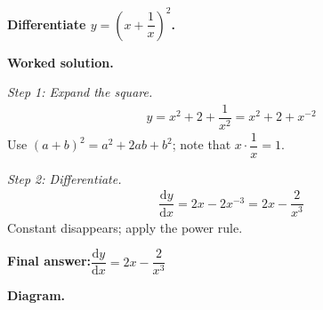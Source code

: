 \documentclass[11pt]{article}
\newcommand{\question}[1]{\par\medskip\noindent\textbf{#1}\par}
\begin{document}
\question{Differentiate \( y = \left( x + \dfrac{1}{x} \right)^2 \).}

\textbf{Worked solution.}

\textit{Step 1: Expand the square.}
\[\begin{gathered}
y = x^2 + 2 + \dfrac{1}{x^2} = x^2 + 2 + x^{-2}
\end{gathered}\]
Use \( (a+b)^2 = a^2 + 2ab + b^2 \); note that \( x \cdot \dfrac{1}{x} = 1 \).

\textit{Step 2: Differentiate.}
\[\begin{gathered}
\dfrac{\mathrm{d}y}{\mathrm{d}x} = 2x - 2x^{-3} = 2x - \dfrac{2}{x^3}
\end{gathered}\]
Constant disappears; apply the power rule.

\begin{answerbox}
\textbf{Final answer:}\quad \(\displaystyle  \dfrac{\mathrm{d}y}{\mathrm{d}x} = 2x - \dfrac{2}{x^3} \)
\end{answerbox}
\textbf{Diagram.}
\end{document}

